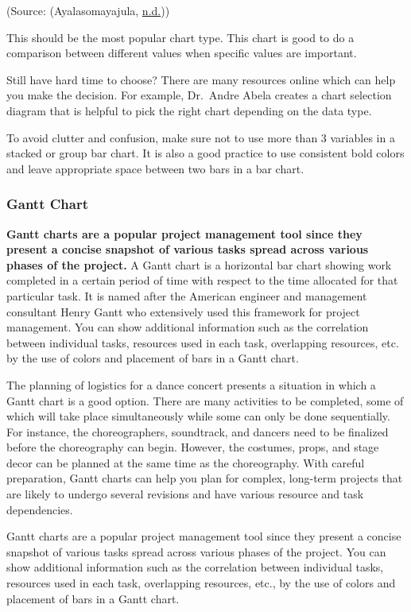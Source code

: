 \documentclass[]{book}
\begin{document}
(Source: (Ayalasomayajula, \protect\hyperlink{ref-aya-time-series}{n.d.}))

This should be the most popular chart type. This chart is good to do a comparison between different values when specific values are important.

Still have hard time to choose? There are many resources online which can help you make the decision. For example, Dr.~Andre Abela creates a chart selection diagram that is helpful to pick the right chart depending on the data type.

To avoid clutter and confusion, make sure not to use more than 3 variables in a stacked or group bar chart. It is also a good practice to use consistent bold colors and leave appropriate space between two bars in a bar chart.

\hypertarget{gantt-chart}{%
\subsubsection{Gantt Chart}\label{gantt-chart}}

\textbf{Gantt charts are a popular project management tool since they present a concise snapshot of various tasks spread across various phases of the project.} A Gantt chart is a horizontal bar chart showing work completed in a certain period of time with respect to the time allocated for that particular task. It is named after the American engineer and management consultant Henry Gantt who extensively used this framework for project management. You can show additional information such as the correlation between individual tasks, resources used in each task, overlapping resources, etc. by the use of colors and placement of bars in a Gantt chart.

The planning of logistics for a dance concert presents a situation in which a Gantt chart is a good option. There are many activities to be completed, some of which will take place simultaneously while some can only be done sequentially. For instance, the choreographers, soundtrack, and dancers need to be finalized before the choreography can begin. However, the costumes, props, and stage decor can be planned at the same time as the choreography. With careful preparation, Gantt charts can help you plan for complex, long-term projects that are likely to undergo several revisions and have various resource and task dependencies.

Gantt charts are a popular project management tool since they present a concise snapshot of various tasks spread across various phases of the project. You can show additional information such as the correlation between individual tasks, resources used in each task, overlapping resources, etc., by the use of colors and placement of bars in a Gantt chart.
\end{document}
